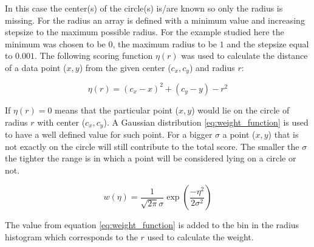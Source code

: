 \documentclass[11pt,twoside]{scrreprt}
\begin{document}
In this case the center(s) of the circle(s) is/are known so only the radius is missing. For the radius an array is defined with a 
minimum value and increasing stepsize to the maximum possible radius. For the example studied here the minimum was chosen to be $0$, 
the maximum radius to be $1$ and the stepsize equal to $0.001$. The following scoring function $\eta(r)$ was used to calculate the distance
of a data point ($x,y$) from the given center ($c_x, c_y$) and radius $r$:

\begin{equation}
\label{eq:score_function}
  \eta(r) = (c_x - x)^2 + (c_y - y) - r ^ 2
\end{equation}

If $\eta(r)=0$ means that the particular point ($x,y$) would lie on the circle of radius $r$ with center ($c_x, c_y$).
A Gaussian distribution \ref{eq:weight_function} is used to have a well defined value for such point. For a bigger $\sigma$ a point 
($x,y$) that is not exactly on the circle will still contribute to the total score. The smaller the $\sigma$ the tighter the range is
in which a point will be considered lying on a circle or not.

\begin{equation}
\label{eq:weight_function}
  w(\eta) = \frac{1}{\sqrt{2\pi}\sigma}\exp\left( \frac{-\eta^2}{2\sigma^2}\right)
\end{equation}

The value from equation \ref{eq:weight_function} is added to the bin in the radius histogram which corresponds to the $r$ used to
calculate the weight.
\end{document}
